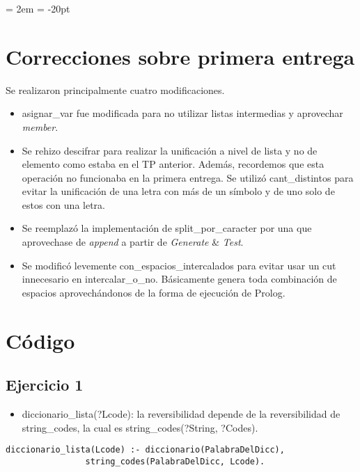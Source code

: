 \documentclass[spanish, 10pt,a4paper]{article}
\numberwithin{equation}{section} %
\begin{document}
{ \oddsidemargin = 2em
	\headheight = -20pt
	\maketitle
}
	\tableofcontents
	\newpage

\section{Correcciones sobre primera entrega}
Se realizaron principalmente cuatro modificaciones. 
\begin{itemize}
\item asignar\_var fue modificada para no utilizar listas intermedias y aprovechar \textit{member}.
\item Se rehizo descifrar para realizar la unificación a nivel de lista y no de elemento como estaba en el TP anterior. Además, recordemos que esta operación no funcionaba en la primera entrega. Se utilizó cant\_distintos para evitar la unificación de una letra con más de un símbolo y de uno solo de estos con una letra.
\item Se reemplazó la implementación de split\_por\_caracter por una que aprovechase de \textit{append} a partir de \textit{Generate} \& \textit{Test}.
\item Se modificó levemente con\_espacios\_intercalados para evitar usar un cut innecesario en intercalar\_o\_no. Básicamente genera toda combinación de espacios aprovechándonos de la forma de ejecución de Prolog.
\end{itemize}

\section{Código}

\subsection{Ejercicio 1}

\begin{itemize}
\item diccionario\_lista(?Lcode): la reversibilidad depende de la reversibilidad de string\_codes, la cual es string\_codes(?String, ?Codes).
\end{itemize}
\begin{lstlisting}
diccionario_lista(Lcode) :- diccionario(PalabraDelDicc), 
			    string_codes(PalabraDelDicc, Lcode). 
\end{lstlisting}
\end{document}
